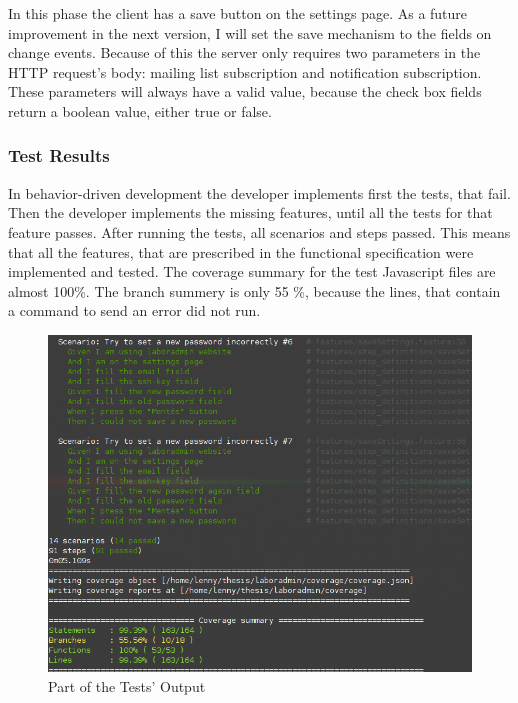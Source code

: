 In this phase the client has a save button on the settings page. As a future improvement in the next version, I will set the save mechanism to the fields on change events. Because of this the server only requires two parameters in the HTTP request's body: mailing list subscription and notification subscription. These parameters will always have a valid value, because the check box fields return a boolean value, either true or false.

\subsubsection{Test Results}
In behavior-driven development the developer implements first the tests, that fail. Then the developer implements the missing features, until all the tests for that feature passes. After running the tests, all scenarios and steps passed. This means that all the features, that are prescribed in the functional specification were implemented and tested. The coverage summary for the test Javascript files are almost 100\%. The branch summery is only 55 \%, because the lines, that contain a command to send an error did not run.

\begin{figure}[!ht]
	\includegraphics[width=\textwidth]{figures/test-result.png}
	\caption{Part of the Tests' Output}
	\label{fig:test-results}
	\end{figure}

